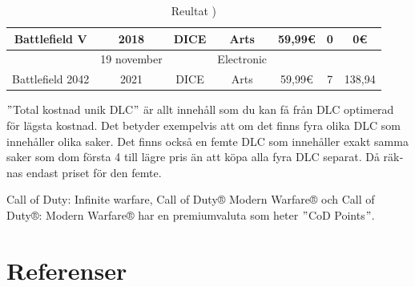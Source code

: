 \documentclass[11p]{article}
\begin{document}
\begin{otherlanguage}{swedish}
\begin{table}[htbp]
\begin{tabular}{|c|c|c|c|c|c|c|}
            Battlefield V & 2018 & DICE & Arts & 59,99€ & 0 & 0€\\
            \hline
            & 19 november && Electronic &&&\\ [-2pt]
            Battlefield 2042 & 2021 & DICE &  Arts & 59,99€ & 7 & 138,94\\
            \hline
        \end{tabular}
        \caption{Reultat )}
        \label{tab:Resultat}
    \end{table}
    \("\)Total kostnad unik DLC\("\) är allt innehåll som du kan få från DLC optimerad för lägsta kostnad.
    Det betyder exempelvis att om det finns fyra olika DLC som innehåller olika saker.
    Det finns också en femte DLC som innehåller exakt samma saker som dom första 4 till lägre pris än att köpa alla fyra DLC separat.
    Då räknas endast priset för den femte.

    Call of Duty: Infinite warfare, Call of Duty® Modern Warfare® och Call of Duty®: Modern Warfare® har en premiumvaluta som heter \("\)CoD Points\("\).



    \newpage
    \section{Referenser}
    \printbibliography[heading=none]

    \end{otherlanguage}
\end{document}
